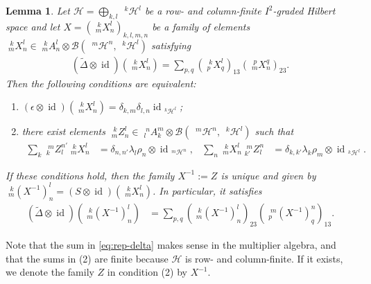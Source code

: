 \documentclass[12pt]{article}
\theoremstyle{change}
\DeclareMathOperator{\id}{id}
\newcommand{\Gr}[5]{\;{}^{\;#2}_{#4}#1_{#5}^{#3}}%
\newcommand{\Gru}[3]{\;{}^{\;#2}#1^{#3}}
\newtheorem{Lem}[Theorem]{Lemma}
\theoremstyle{definition}
\numberwithin{equation}{section}
\begin{document}
\begin{Lem} \label{lemma:rep-corep}
  Let $\mathcal{H}=\bigoplus_{k,l} \Gru{\mathcal{H}}{k}{l}$ be a row-
  and column-finite $I^{2}$-graded Hilbert space and let
  $X=(\Gr{X}{k}{l}{m}{n})_{k,l,m,n}$ be a family of elements
  $\Gr{X}{k}{l}{m}{n} \in \Gr{A}{k}{l}{m}{n} \otimes
  \mathcal{B}(\Gru{\mathcal{H}}{m}{n},\Gru{\mathcal{H}}{k}{l})$
  satisfying
  \begin{align} \label{eq:rep-delta}
    (\tilde \Delta \otimes \id)(\Gr{X}{k}{l}{m}{n}) = \sum_{p,q}
    \left(\Gr{X}{k}{l}{p}{q}\right)_{13}\left(\Gr{X}{p}{q}{m}{n}\right)_{23}. 
  \end{align}
  Then the following conditions are equivalent:
  \begin{enumerate}
  \item $(\epsilon \otimes
    \id)(\Gr{X}{k}{l}{m}{n})=\delta_{k,m}\delta_{l,n}\id_{\Gru{\mathcal{H}}{k}{l}}$;
  \item there exist elements $\Gr{Z}{k}{l}{m}{n} \in
    \Gr{A}{n}{m}{l}{k} \otimes
    \mathcal{B}(\Gru{\mathcal{H}}{m}{n},\Gru{\mathcal{H}}{k}{l})$ such
    that
  \begin{align*}
    \sum_{k} \Gr{Z}{m}{n'}{k}{l} \Gr{X}{k}{l}{m}{n} &= \delta_{n,n'}
    \lambda_{l} \rho_{n} \otimes \id_{\Gru{\mathcal{H}}{m}{n}}, &
    \sum_{n} \Gr{X}{k}{l}{m}{n} \Gr{Z}{m}{n}{k'}{l} &= \delta_{k,k'}
    \lambda_{k} \rho_{m} \otimes \id_{\Gru{\mathcal{H}}{k}{l}}.
  \end{align*}
  \end{enumerate}
  If these conditions hold, then the family $X^{-1}:=Z$ is unique and
  given by $\Gr{(X^{-1})}{k}{l}{m}{n}=(S \otimes
  \id)(\Gr{X}{k}{l}{m}{n})$. In particular, it satisfies
  \begin{align*}
    (\tilde \Delta \otimes \id)(\Gr{(X^{-1})}{k}{l}{m}{n}) &=
    \sum_{p,q}
    \left(\Gr{(X^{-1})}{k}{l}{m}{n}\right)_{23}\left(\Gr{(X^{-1})}{m}{n}{p}{q}\right)_{13}.
  \end{align*}
\end{Lem}
Note that the sum in \eqref{eq:rep-delta} makes sense in the
multiplier algebra, and that the sums in (2) are finite because
$\mathcal{H}$ is row- and column-finite. If it exists, we denote the family $Z$ in condition (2)  by $X^{-1}$.
\end{document}
